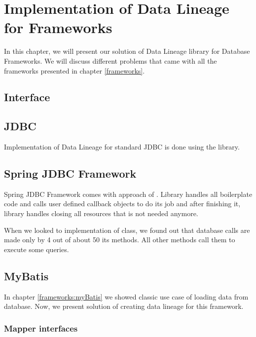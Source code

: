 
\chapter{Implementation of Data Lineage for Frameworks}

In this chapter, we will present our solution of Data Lineage library for Database Frameworks.
We will discuss different problems that came with all the frameworks presented in chapter \ref{frameworks}.

\section{Interface}

\section{JDBC \label{implementation:jdbc}}

Implementation of Data Lineage for standard JDBC is done using the library.





\section{Spring JDBC Framework}

Spring JDBC Framework comes with approach of . Library handles
all boilerplate code and calls user defined callback objects to do its job
and after finishing it, library handles closing all resources that is not needed anymore.

When we looked to implementation of  class, we found out
that database calls are made only by 4 out of about 50 its methods.
All other methods call them to execute some queries.




\section{MyBatis}

In chapter \ref{frameworks:myBatis} we showed classic use case of loading data from database.
Now, we present solution of creating data lineage for this framework.



\subsection{Mapper interfaces}

